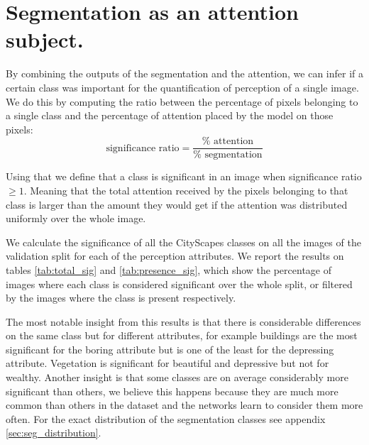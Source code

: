 \section{Segmentation as an attention subject.}
By combining the outputs of the segmentation and the attention, we can infer if a certain class was
important for the quantification of perception of a single image. We do this by computing the ratio between
the percentage of pixels belonging to a single class and the percentage of attention placed by the model on
those pixels:
\begin{equation}
	\text{significance ratio} = \frac{\% \text{ attention}}{ \% \text{ segmentation}}
\end{equation}

Using that we define that a class is significant in an image when significance ratio $\geq 1$.
Meaning that the total attention received by the pixels belonging to that class is larger
than the amount they would get if the attention was distributed uniformly over the whole image.

We calculate the significance of all the CityScapes classes
on all the images of the validation split for each of the perception attributes. We report
the results on tables \ref{tab:total_sig} and \ref{tab:presence_sig}, which show the percentage
of images where each class is considered significant over the whole split, or filtered by the images
where the class is present respectively.

The most notable insight from this results is that there is considerable differences on the same class
but for different attributes, for example buildings are the most significant for the boring attribute
but is one of the least for the depressing attribute. Vegetation is significant for beautiful and
depressive but not for wealthy. Another insight is that some classes are on average considerably more significant
than others, we believe this happens because they are much more common than others in the dataset
and the networks learn to consider them more often. For the exact distribution of the segmentation classes
see appendix \ref{sec:seg_distribution}.

